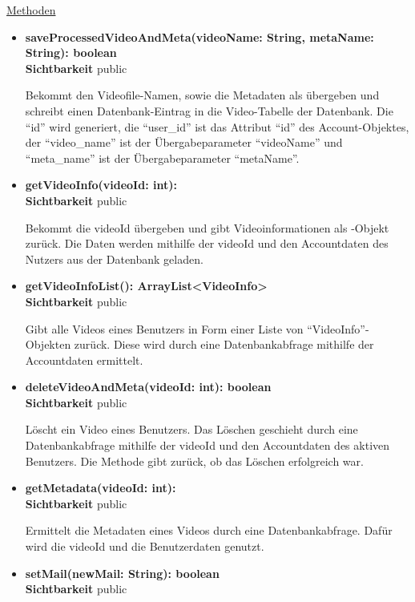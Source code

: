 \underline{Methoden}
\begin{itemize}
\itemsep0pt
\item \textbf{saveProcessedVideoAndMeta(videoName: String, metaName: String): boolean}\hfill\\
\textbf{Sichtbarkeit} public

Bekommt den Videofile-Namen, sowie die Metadaten als übergeben und schreibt einen Datenbank-Eintrag in die Video-Tabelle der Datenbank. Die ``id'' wird generiert, die ``user\_id'' ist das Attribut ``id'' des Account-Objektes, der ``video\_name'' ist der Übergabeparameter ``videoName'' und ``meta\_name'' ist der Übergabeparameter ``metaName''.

\item \textbf{getVideoInfo(videoId: int): }\hfill\\
\textbf{Sichtbarkeit} public

Bekommt die videoId übergeben und gibt Videoinformationen als -Objekt zurück. Die Daten werden mithilfe der videoId und den Accountdaten des Nutzers aus der Datenbank geladen.

\item \textbf{getVideoInfoList(): ArrayList<VideoInfo>}\hfill\\
\textbf{Sichtbarkeit} public

Gibt alle Videos eines Benutzers in Form einer Liste von ``VideoInfo''-Objekten zurück. Diese wird durch eine Datenbankabfrage mithilfe der Accountdaten ermittelt.

\item \textbf{deleteVideoAndMeta(videoId: int): boolean}\hfill\\
\textbf{Sichtbarkeit} public

Löscht ein Video eines Benutzers. Das Löschen geschieht durch eine Datenbankabfrage mithilfe der videoId und den Accountdaten des aktiven Benutzers. Die Methode gibt zurück, ob das Löschen erfolgreich war.

\item \textbf{getMetadata(videoId: int): }\hfill\\
\textbf{Sichtbarkeit} public

Ermittelt die Metadaten eines Videos durch eine Datenbankabfrage. Dafür wird die videoId und die Benutzerdaten genutzt.

\item \textbf{setMail(newMail: String): boolean}\hfill\\
\textbf{Sichtbarkeit} public


\end{itemize}
